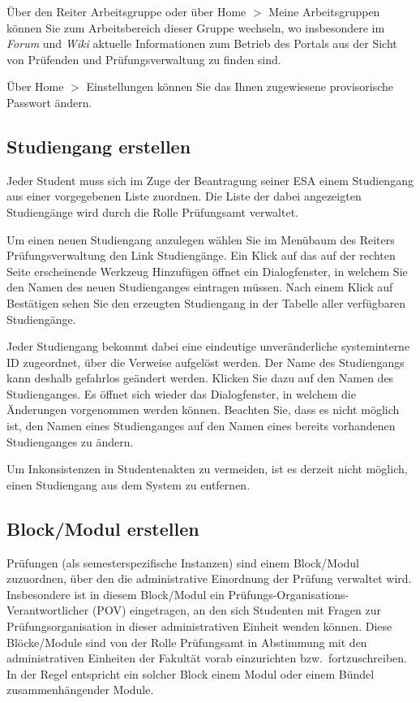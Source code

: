 \documentclass[a4paper,11pt]{article}
\newcommand{\knopf}[1]{{\sc #1}}
\begin{document}
Über den Reiter \knopf{Arbeitsgruppe} oder über \knopf{Home $>$ Meine
  Arbeitsgruppen} können Sie zum Arbeitsbereich dieser Gruppe wechseln, wo
insbesondere im {\em Forum} und {\em Wiki} aktuelle Informationen zum Betrieb
des Portals aus der Sicht von Prüfenden und Prüfungsverwaltung zu finden sind.

Über \knopf{Home $>$ Einstellungen} können Sie das Ihnen zugewiesene
provisorische Passwort ändern.

\subsection{Studiengang erstellen}

Jeder Student muss sich im Zuge der Beantragung seiner ESA einem Studiengang
aus einer vorgegebenen Liste zuordnen.  Die Liste der dabei angezeigten
Studiengänge wird durch die Rolle Prüfungsamt verwaltet. 

Um einen neuen Studiengang anzulegen wählen Sie im Menübaum des Reiters
\knopf{Prüfungsverwaltung} den Link \knopf{Studiengänge}. Ein Klick auf das
auf der rechten Seite erscheinende Werkzeug \knopf{Hinzufügen} öffnet ein
Dialogfenster, in welchem Sie den Namen des neuen Studienganges eintragen
müssen.  Nach einem Klick auf \knopf{Bestätigen} sehen Sie den erzeugten
Studiengang in der Tabelle aller verfügbaren Studiengänge.

Jeder Studiengang bekommt dabei eine eindeutige unveränderliche systeminterne
ID zugeordnet, über die Verweise aufgelöst werden. Der Name des Studiengangs
kann deshalb gefahrlos geändert werden. Klicken Sie dazu auf den Namen des
Studienganges. Es öffnet sich wieder das Dialogfenster, in welchem die
Änderungen vorgenommen werden können. Beachten Sie, dass es nicht möglich ist,
den Namen eines Studienganges auf den Namen eines bereits vorhandenen
Studienganges zu ändern.  

Um Inkonsistenzen in Studentenakten zu vermeiden, ist es derzeit nicht
möglich, einen Studiengang aus dem System zu entfernen.

\subsection{Block/Modul erstellen}

Prüfungen (als semesterspezifische Instanzen) sind einem Block/Modul
zuzuordnen, über den die administrative Einordnung der Prüfung verwaltet wird.
Insbesondere ist in diesem Block/Modul ein
Prüfungs-Organisations-Verantwortlicher (POV) eingetragen, an den sich
Studenten mit Fragen zur Prüfungsorganisation in dieser administrativen
Einheit wenden können.  Diese Blöcke/Module sind von der Rolle Prüfungsamt in
Abstimmung mit den administrativen Einheiten der Fakultät vorab einzurichten
bzw.\ fortzuschreiben.  In der Regel entspricht ein solcher Block einem Modul
oder einem Bündel zusammenhängender Module. 
\end{document}
